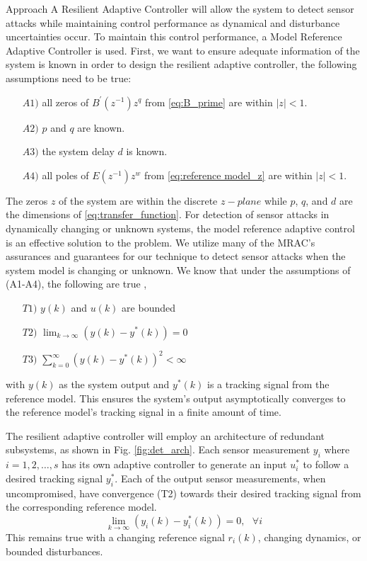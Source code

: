 \begin{section}{Approach}
A Resilient Adaptive Controller will allow the system to detect sensor attacks while maintaining control performance as dynamical and disturbance uncertainties occur. To maintain this control performance, a Model Reference Adaptive Controller is used. First, we want to ensure adequate information of the system is known in order to design the resilient adaptive controller, the following assumptions need to be true:
	\begin{enumerate}[leftmargin=3\parindent]
	\item[$A1)$] all zeros of $B^{'}(z^{-1})z^q$ from \eqref{eq:B_prime} are within $|z|<1$. 
	\item[$A2)$] $p$ and $q$ are known. 
	\item[$A3)$] the system delay $d$ is known.
	\item[$A4)$] all poles of $E(z^{-1})z^w$ from \eqref{eq:reference model_z} are within $|z|<1$.
	\end{enumerate}
The zeros $z$ of the system are within the discrete $z-plane$ while $p$, $q$, and $d$ are the dimensions of \eqref{eq:transfer_function}. For detection of sensor attacks in dynamically changing or unknown systems, the model reference adaptive control is an effective solution to the problem. We utilize many of the MRAC's assurances and guarantees for our technique to detect sensor attacks when the system model is changing or unknown. We know that under the assumptions of (A1-A4), the following are true \cite{tao2003adaptive},
	\begin{enumerate}[label=(\roman*),leftmargin=3\parindent]
	\label{assumtions_ensure}
	\item[$T1)$] $y(k)$ and $u(k)$ are bounded 
	\item[$T2)$] $\lim_{k\to\infty}(y(k)-y^*(k))=0$
	\label{Truth2}
	\item[$T3)$] $\sum_{k=0}^\infty(y(k)-y^*(k))^2<\infty$
	\end{enumerate}
with $y(k)$ as the system output and $y^*(k)$ is a tracking signal from the reference model. This ensures the system's output asymptotically converges to the reference model's tracking signal in a finite amount of time.

The resilient adaptive controller will employ an architecture of redundant subsystems, as shown in Fig. \ref{fig:det_arch}. Each sensor measurement $y_i$ where $i=1,2,\dots,s$ has its own adaptive controller to generate an input $u^*_i$ to follow a desired tracking signal $y^*_i$. Each of the output sensor measurements, when uncompromised, have convergence (T2) towards their desired tracking signal from the corresponding reference model. 
    \begin{equation}
    \label{multiple_output_tracking}
    \lim_{k\to\infty}(y_i(k)-y^*_i(k))=0, \text{ }\forall i
    \end{equation}
This remains true with a changing reference signal $r_i(k)$, changing dynamics, or bounded disturbances. 


\end{section}
